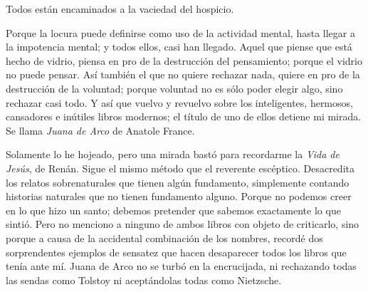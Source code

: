 Todos están encaminados a la vaciedad del hospicio.

Porque la locura puede definirse como uso de la actividad mental, hasta llegar a la impotencia
mental; y todos ellos, casi han llegado. Aquel que piense que está hecho de vidrio, piensa en pro de la
destrucción del pensamiento; porque el vidrio no puede pensar. Así también el que no quiere rechazar
nada, quiere en pro de la destrucción de la voluntad; porque voluntad no es sólo poder elegir algo, sino
rechazar casi todo. Y así que vuelvo y revuelvo sobre los inteligentes, hermosos, cansadores e inútiles
libros modernos; el título de uno de ellos detiene mi mirada. Se llama \emph{Juana de Arco} de Anatole France.

Solamente lo he hojeado, pero una mirada bastó para recordarme la \emph{Vida de Jesús}, de Renán. Sigue el
mismo método que el reverente escéptico. Desacredita los relatos sobrenaturales que tienen algún
fundamento, simplemente contando historias naturales que no tienen fundamento alguno. Porque no
podemos creer en lo que hizo un santo; debemos pretender que sabemos exactamente lo que sintió. Pero
no menciono a ninguno de ambos libros con objeto de criticarlo, sino porque a causa de la accidental
combinación de los nombres, recordé dos sorprendentes ejemplos de sensatez que hacen desaparecer
todos los libros que tenía ante mí. Juana de Arco no se turbó en la encrucijada, ni rechazando todas las
sendas como Tolstoy ni aceptándolas todas como Nietzsche.

